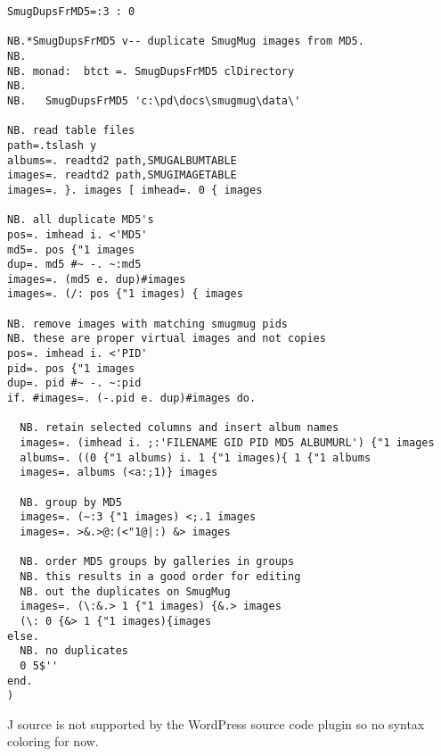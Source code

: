 \begin{lstlisting}[language=jdoc, frame=single,framerule=0pt,label=lst:scr369X0]
SmugDupsFrMD5=:3 : 0

NB.*SmugDupsFrMD5 v-- duplicate SmugMug images from MD5.
NB.
NB. monad:  btct =. SmugDupsFrMD5 clDirectory
NB.
NB.   SmugDupsFrMD5 'c:\pd\docs\smugmug\data\'

NB. read table files
path=.tslash y
albums=. readtd2 path,SMUGALBUMTABLE
images=. readtd2 path,SMUGIMAGETABLE
images=. }. images [ imhead=. 0 { images

NB. all duplicate MD5's
pos=. imhead i. <'MD5'
md5=. pos {"1 images
dup=. md5 #~ -. ~:md5
images=. (md5 e. dup)#images
images=. (/: pos {"1 images) { images

NB. remove images with matching smugmug pids
NB. these are proper virtual images and not copies
pos=. imhead i. <'PID'
pid=. pos {"1 images
dup=. pid #~ -. ~:pid
if. #images=. (-.pid e. dup)#images do.

  NB. retain selected columns and insert album names
  images=. (imhead i. ;:'FILENAME GID PID MD5 ALBUMURL') {"1 images
  albums=. ((0 {"1 albums) i. 1 {"1 images){ 1 {"1 albums
  images=. albums (<a:;1)} images

  NB. group by MD5
  images=. (~:3 {"1 images) <;.1 images
  images=. >&.>@:(<"1@|:) &> images

  NB. order MD5 groups by galleries in groups
  NB. this results in a good order for editing
  NB. out the duplicates on SmugMug
  images=. (\:&.> 1 {"1 images) {&.> images
  (\: 0 {&> 1 {"1 images){images
else.
  NB. no duplicates
  0 5$''
end.
)
\end{lstlisting}

J source is not supported by the WordPress source code plugin so no
syntax coloring for now.


%